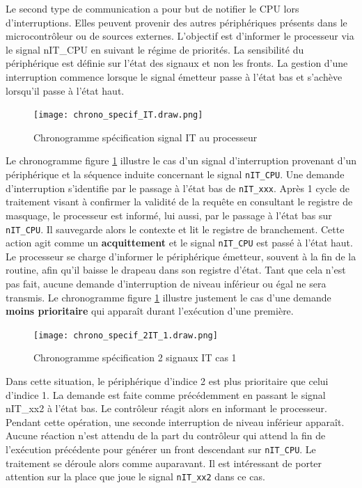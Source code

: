 \gap
Le second type de communication a pour but de notifier le \gls{CPU} lors d'interruptions.
Elles peuvent provenir des autres périphériques présents dans le microcontrôleur ou de sources externes.
L'objectif est d'informer le processeur via le signal nIT\_CPU en suivant le régime de priorités.
La sensibilité du périphérique est définie sur l'état des signaux et non les fronts.
La gestion d'une interruption commence lorsque le signal émetteur passe à l'état bas et s'achève lorsqu'il passe à l'état haut. 
\begin{figure}[H]
	\centering
	\texttt{[image: chrono\_specif\_IT.draw.png]}
	\caption{Chronogramme spécification signal IT au processeur}
	\label{fig:spe_IT}
\end{figure}
Le chronogramme figure \ref{fig:spe_IT} illustre le cas d'un signal d'interruption provenant d'un périphérique et la séquence induite concernant le signal \texttt{nIT\_CPU}.
Une demande d'interruption s'identifie par le passage à l'état bas de \texttt{nIT\_xxx}. 
Après 1 cycle de traitement visant à confirmer la validité de la requête en consultant le registre de masquage, le processeur est informé, lui aussi, par le passage à l'état bas sur \texttt{nIT\_CPU}.
Il sauvegarde alors le contexte et lit le registre de branchement.
Cette action agit comme un \textbf{acquittement} et le signal \texttt{nIT\_CPU} est passé à l'état haut.
Le processeur se charge d'informer le périphérique émetteur, souvent à la fin de la routine, afin qu'il baisse le drapeau dans son registre d'état.
Tant que cela n'est pas fait, aucune demande d'interruption de niveau inférieur ou égal ne sera transmis.
Le chronogramme figure \ref{fig:spe_IT} illustre justement le cas d'une demande \textbf{moins prioritaire} qui apparaît durant l'exécution d'une première.
\begin{figure}[H]
	\centering
	\texttt{[image: chrono\_specif\_2IT\_1.draw.png]}
	\caption{Chronogramme spécification 2 signaux IT cas 1}
	\label{fig:spe_IT_cas1}
\end{figure}
Dans cette situation, le périphérique d'indice 2 est plus prioritaire que celui d'indice 1. 
La demande est faite comme précédemment en passant le signal nIT\_xx2 à l'état bas.
Le contrôleur réagit alors en informant le processeur.
Pendant cette opération, une seconde interruption de niveau inférieur apparaît.
Aucune réaction n'est attendu de la part du contrôleur qui attend la fin de l'exécution précédente pour générer un front descendant sur \texttt{nIT\_CPU}.
Le traitement se déroule alors comme auparavant.
Il est intéressant de porter attention sur la place que joue le signal \texttt{nIT\_xx2} dans ce cas.

